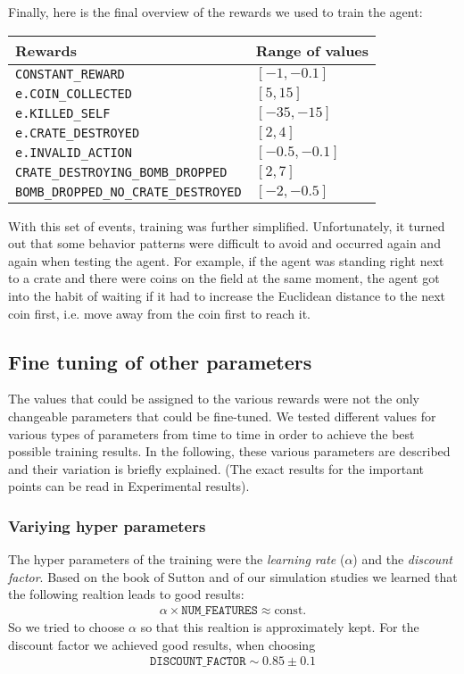 Finally, here is the final overview of the rewards we used to train the agent:

\begin{table}[h!]
\centering
\begin{tabular}{|| l | l ||} 
 \hline
 Rewards &  Range of values\\ [0.5ex] 
 \hline\hline
  \texttt{CONSTANT\_REWARD} & $[-1,-0.1]$  \\[0.5ex] 
  \texttt{e.COIN\_COLLECTED} & $[5, 15]$ \\ [0.5ex] 
  \texttt{e.KILLED\_SELF} & $[-35 , -15]$ \\[0.5ex] 
  \texttt{e.CRATE\_DESTROYED} & $[2, 4]$ \\[0.5ex] 
  \texttt{e.INVALID\_ACTION} & $[-0.5,-0.1]$  \\[0.5ex] 
  \texttt{CRATE\_DESTROYING\_BOMB\_DROPPED} & $[2,7]$  \\[0.5ex] 
  \texttt{BOMB\_DROPPED\_NO\_CRATE\_DESTROYED} & $[-2,-0.5]$  \\[1ex] 
 \hline
\end{tabular}
\end{table}

With this set of events, training was further simplified. Unfortunately, it turned out that some behavior patterns were difficult to avoid and occurred again and again when testing the agent. For example, if the agent was standing right next to a crate and there were coins on the field at the same moment, the agent got into the habit of waiting if it had to increase the Euclidean distance to the next coin first, i.e. move away from the coin first to reach it.

\subsection{Fine tuning of other parameters}
The values that could be assigned to the various rewards were not the only changeable parameters that could be fine-tuned. We tested different values for various types of parameters from time to time in order to achieve the best possible training results. In the following, these various parameters are described and their variation is briefly explained. (The exact results for the important points can be read in Experimental results).

\subsubsection*{Variying hyper parameters}
The hyper parameters of the training were the \textit{learning rate} ($\alpha$) and the \textit{discount factor}. Based on the book of Sutton \cite{Sutton1998} and of our simulation studies we learned that the following realtion leads to good results:
\begin{align*}
\alpha \times \texttt{NUM\_FEATURES} \approx \text{const.}
\end{align*}
So we tried to choose $\alpha$ so that this realtion is approximately kept. For the discount factor we achieved good results, when choosing 
\begin{align*}
\texttt{DISCOUNT\_FACTOR} \sim 0.85 \pm 0.1
\end{align*}

